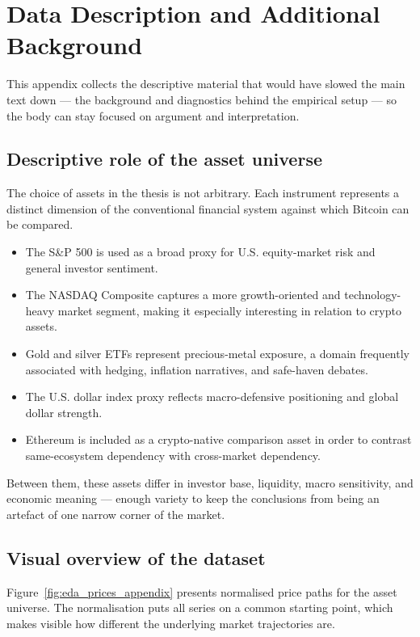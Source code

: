 \section{Data Description and Additional Background}

This appendix collects the descriptive material that would have slowed the main text down --- the background and diagnostics behind the empirical setup --- so the body can stay focused on argument and interpretation.

\subsection{Descriptive role of the asset universe}

The choice of assets in the thesis is not arbitrary. Each instrument represents a distinct dimension of the conventional financial system against which Bitcoin can be compared.

\begin{itemize}
    \item The S\&P 500 is used as a broad proxy for U.S. equity-market risk and general investor sentiment.
    \item The NASDAQ Composite captures a more growth-oriented and technology-heavy market segment, making it especially interesting in relation to crypto assets.
    \item Gold and silver ETFs represent precious-metal exposure, a domain frequently associated with hedging, inflation narratives, and safe-haven debates.
    \item The U.S. dollar index proxy reflects macro-defensive positioning and global dollar strength.
    \item Ethereum is included as a crypto-native comparison asset in order to contrast same-ecosystem dependency with cross-market dependency.
\end{itemize}

Between them, these assets differ in investor base, liquidity, macro sensitivity, and economic meaning --- enough variety to keep the conclusions from being an artefact of one narrow corner of the market.

\subsection{Visual overview of the dataset}

Figure~\ref{fig:eda_prices_appendix} presents normalised price paths for the asset universe. The normalisation puts all series on a common starting point, which makes visible how different the underlying market trajectories are.

